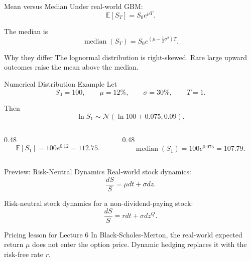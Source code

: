 \documentclass[aspectratio=169,11pt]{beamer}
\newcommand{\E}{\mathbb{E}}
\newcommand{\Normal}{\mathcal{N}}
\begin{document}
\begin{frame}{Mean versus Median}
    Under real-world GBM:
    \[
        \E[S_T]=S_0e^{\mu T}.
    \]

    The median is
    \[
        \operatorname{median}(S_T)
        =
        S_0e^{(\mu-\frac{1}{2}\sigma^2)T}.
    \]

    \begin{block}{Why they differ}
        The lognormal distribution is right-skewed.
        Rare large upward outcomes raise the mean above the median.
    \end{block}
\end{frame}

\begin{frame}{Numerical Distribution Example}
    Let
    \[
        S_0=100,\qquad
        \mu=12\%,\qquad
        \sigma=30\%,\qquad
        T=1.
    \]

    Then
    \[
        \ln S_1
        \sim
        \Normal(\ln 100+0.075,0.09).
    \]

    \begin{columns}[T]
        \begin{column}{0.48\textwidth}
            \[
                \E[S_1]=100e^{0.12}=112.75.
            \]
        \end{column}
        \begin{column}{0.48\textwidth}
            \[
                \operatorname{median}(S_1)=100e^{0.075}=107.79.
            \]
        \end{column}
    \end{columns}
\end{frame}

\begin{frame}[label=risk_neutral_preview_main]{Preview: Risk-Neutral Dynamics}
    Real-world stock dynamics:
    \[
        \frac{dS}{S}=\mu dt+\sigma dz.
    \]

    Risk-neutral stock dynamics for a non-dividend-paying stock:
    \[
        \frac{dS}{S}=r dt+\sigma dz^Q.
    \]

    \begin{alertblock}{Pricing lesson for Lecture 6}
        In Black-Scholes-Merton, the real-world expected return \(\mu\) does not enter the option price.
        Dynamic hedging replaces it with the risk-free rate \(r\).
    \end{alertblock}

    \hyperlink{deriv_risk_neutral_distribution}{}
\end{frame}
\end{document}
